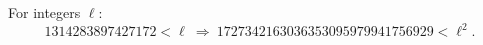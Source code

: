 For integers $\ell$:
\[ 1314283897427172<\ell\ \Longrightarrow\ 1727342163036353095979941756929<\ell^2 . \]

